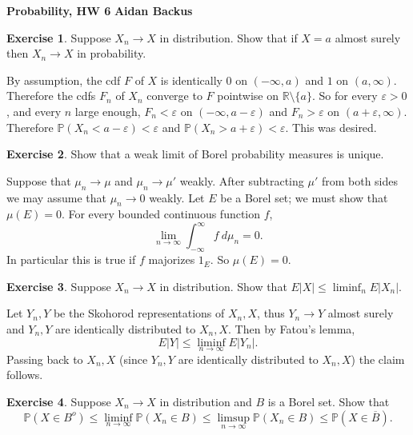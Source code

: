 \documentclass[10pt]{article}
\newcommand{\RR}{\mathbb{R}}
\newcommand{\PP}{\mathbb P}
\theoremstyle{definition}
\newtheorem{exer}{Exercise}
\begin{document}
\noindent
\large\textbf{Probability, HW 6} \hfill \textbf{Aidan Backus} \\



\begin{exer}
Suppose $X_n \to X$ in distribution. Show that if $X = a$ almost surely then $X_n \to X$ in probability.
\end{exer}

By assumption, the cdf $F$ of $X$ is identically $0$ on $(-\infty, a)$ and $1$ on $(a, \infty)$.
Therefore the cdfs $F_n$ of $X_n$ converge to $F$ pointwise on $\RR \setminus \{a\}$.
So for every $\varepsilon > 0$, and every $n$ large enough, $F_n < \varepsilon$ on $(-\infty, a - \varepsilon)$ and $F_n > \varepsilon$ on $(a + \varepsilon, \infty)$.
Therefore $\PP(X_n < a - \varepsilon) < \varepsilon$ and $\PP(X_n > a + \varepsilon) < \varepsilon$.
This was desired.

\begin{exer}
Show that a weak limit of Borel probability measures is unique.
\end{exer}

Suppose that $\mu_n \to \mu$ and $\mu_n \to \mu'$ weakly.
After subtracting $\mu'$ from both sides we may assume that $\mu_n \to 0$ weakly.
Let $E$ be a Borel set; we must show that $\mu(E) = 0$.
For every bounded continuous function $f$,
$$\lim_{n \to \infty} \int_{-\infty}^\infty f~d\mu_n = 0.$$
In particular this is true if $f$ majorizes $1_E$. So $\mu(E) = 0$.

\begin{exer}
Suppose $X_n \to X$ in distribution. Show that $E|X| \leq \liminf_n E|X_n|$.
\end{exer}

Let $Y_n,Y$ be the Skohorod representations of $X_n,X$, thus $Y_n \to Y$ almost surely and $Y_n,Y$ are identically distributed to $X_n,X$.
Then by Fatou's lemma,
$$E|Y| \leq \liminf_{n \to \infty} E|Y_n|.$$
Passing back to $X_n,X$ (since $Y_n,Y$ are identically distributed to $X_n,X$) the claim follows.

\begin{exer}
Suppose $X_n \to X$ in distribution and $B$ is a Borel set. Show that
$$\PP(X \in B^o) \leq \liminf_{n \to \infty} \PP(X_n \in B) \leq \limsup_{n \to \infty} \PP(X_n \in B) \leq \PP(X \in \overline B).$$
\end{exer}
\end{document}
